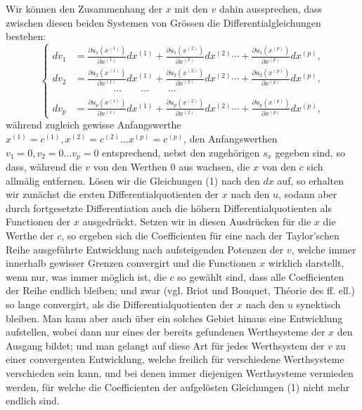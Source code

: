 \documentclass[10pt]{article}
\begin{document}
Wir können den Zusammenhang der \(x\) mit den \(v\) dahin aussprechen, dass zwischen diesen beiden Systemen von Grössen die Differentialgleichungen bestehen:
\[
\tag{1}\left\{\begin{aligned}
dv_1&=\frac{\partial u_1(x^{(1)})}{\partial x^{(1)}}dx^{(1)}+\frac{\partial u_1(x^{(2)})}{\partial x^{(2)}}dx^{(2)}\cdots+\frac{\partial u_1(x^{(p)})}{\partial x^{(p)}}dx^{(p)},\\
dv_2&=\frac{\partial u_2(x^{(1)})}{\partial x^{(1)}}dx^{(1)}+\frac{\partial u_2(x^{(2)})}{\partial x^{(2)}}dx^{(2)}\cdots+\frac{\partial u_2(x^{(p)})}{\partial x^{(p)}}dx^{(p)},\\[-0.35em]
&\hspace{4em}\cdots\qquad\cdots\qquad\cdots\\[-0.35em]
dv_p&=\frac{\partial u_p(x^{(1)})}{\partial x^{(1)}}dx^{(1)}+\frac{\partial u_p(x^{(2)})}{\partial x^{(2)}}dx^{(2)}\cdots+\frac{\partial u_p(x^{(p)})}{\partial x^{(p)}}dx^{(p)},
\end{aligned}\right.
\]
während zugleich gewisse Anfangswerthe \(x^{(1)}=c^{(1)},x^{(2)}=c^{(2)}\ldots x^{(p)}=c^{(p)}\), den Anfangswerthen \(v_1=0,v_2=0\ldots v_p=0\) entsprechend, nebst den zugehörigen \(s_x\) gegeben sind, so dass, während die \(v\) von den Werthen 0 aus wachsen, die \(x\) von den \(c\) sich allmälig entfernen. Lösen wir die Gleichungen (1) nach den \(dx\) auf, so erhalten wir zunächst die ersten Differentialquotienten der \(x\) nach den \(u\), sodann aber durch fortgesetzte Differentiation auch die höhern Differentialquotienten als Functionen der \(x\) ausgedrückt. Setzen wir in diesen Ausdrücken für die \(x\) die Werthe der \(c\), so ergeben sich die Coefficienten für eine nach der Taylor'schen Reihe ausgeführte Entwicklung nach aufsteigenden Potenzen der \(v\), welche immer innerhalb gewisser Grenzen convergirt und die Functionen \(x\) wirklich darstellt, wenn nur, was immer möglich ist, die \(c\) so gewählt sind, dass alle Coefficienten der Reihe endlich bleiben; und zwar (vgl. Briot und Bouquet, Théorie des ff. ell.) so lange convergirt, als die Differentialquotienten der \(x\) nach den \(u\) synektisch bleiben. Man kann aber auch über ein solches Gebiet hinaus eine Entwicklung aufstellen, wobei dann nur eines der bereits gefundenen Werthsysteme der \(x\) den Ausgang bildet; und man gelangt auf diese Art für jedes Werthsystem der \(v\) zu einer convergenten Entwicklung, welche freilich für verschiedene Werthsysteme verschieden sein kann, und bei denen immer diejenigen Werthsysteme vermieden werden, für welche die Coefficienten der aufgelösten Gleichungen (1) nicht mehr endlich sind.
\end{document}
